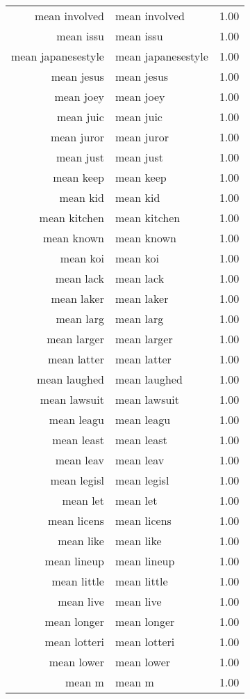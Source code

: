 \begin{table}[ht]
\begin{tabular}{rlr}
  mean involved & mean involved & 1.00 \\ 
  mean issu & mean issu & 1.00 \\ 
  mean japanesestyle & mean japanesestyle & 1.00 \\ 
  mean jesus & mean jesus & 1.00 \\ 
  mean joey & mean joey & 1.00 \\ 
  mean juic & mean juic & 1.00 \\ 
  mean juror & mean juror & 1.00 \\ 
  mean just & mean just & 1.00 \\ 
  mean keep & mean keep & 1.00 \\ 
  mean kid & mean kid & 1.00 \\ 
  mean kitchen & mean kitchen & 1.00 \\ 
  mean known & mean known & 1.00 \\ 
  mean koi & mean koi & 1.00 \\ 
  mean lack & mean lack & 1.00 \\ 
  mean laker & mean laker & 1.00 \\ 
  mean larg & mean larg & 1.00 \\ 
  mean larger & mean larger & 1.00 \\ 
  mean latter & mean latter & 1.00 \\ 
  mean laughed & mean laughed & 1.00 \\ 
  mean lawsuit & mean lawsuit & 1.00 \\ 
  mean leagu & mean leagu & 1.00 \\ 
  mean least & mean least & 1.00 \\ 
  mean leav & mean leav & 1.00 \\ 
  mean legisl & mean legisl & 1.00 \\ 
  mean let & mean let & 1.00 \\ 
  mean licens & mean licens & 1.00 \\ 
  mean like & mean like & 1.00 \\ 
  mean lineup & mean lineup & 1.00 \\ 
  mean little & mean little & 1.00 \\ 
  mean live & mean live & 1.00 \\ 
  mean longer & mean longer & 1.00 \\ 
  mean lotteri & mean lotteri & 1.00 \\ 
  mean lower & mean lower & 1.00 \\ 
  mean m & mean m & 1.00 \\ 

\end{tabular}
\end{table}
